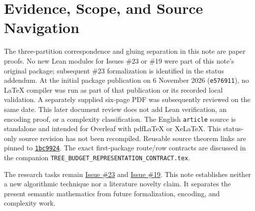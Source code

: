 \documentclass[11pt]{article}
\theoremstyle{remark}
\newcommand{\code}[1]{\nolinkurl{#1}}
\begin{document}
\section*{Evidence, Scope, and Source Navigation}
The three-partition correspondence and gluing separation in this note are paper proofs.
No new Lean modules for Issues \#23 or \#19 were part of this note's original package; subsequent \#23 formalization is identified in the status addendum.
At the initial package publication on 6 November 2026 (\code{e576911}), no LaTeX compiler was run as part of that publication or its recorded local validation.
A separately supplied six-page PDF was subsequently reviewed on the same date. This later document review does not add Lean verification, an encoding proof, or a complexity classification.
The English \code{article} source is standalone and intended for Overleaf with pdfLaTeX or XeLaTeX. This status-only source revision has not been recompiled.
Reusable source theorem links are pinned to
\href{https://github.com/huam54925-cpu/uav-routing-certification/commit/1bc992475a9bd515d77245e2bc0471e5ecab2fd5}{\code{1bc9924}}.
The exact first-package route/row contracts are discussed in the companion
\code{TREE_BUDGET_REPRESENTATION_CONTRACT.tex}.

The research tasks remain
\href{https://github.com/huam54925-cpu/uav-routing-certification/issues/23}{Issue \#23}
and \href{https://github.com/huam54925-cpu/uav-routing-certification/issues/19}{Issue \#19}.
This note establishes neither a new algorithmic technique nor a literature novelty claim.
It separates the present semantic mathematics from future formalization, encoding, and complexity work.
\end{document}
